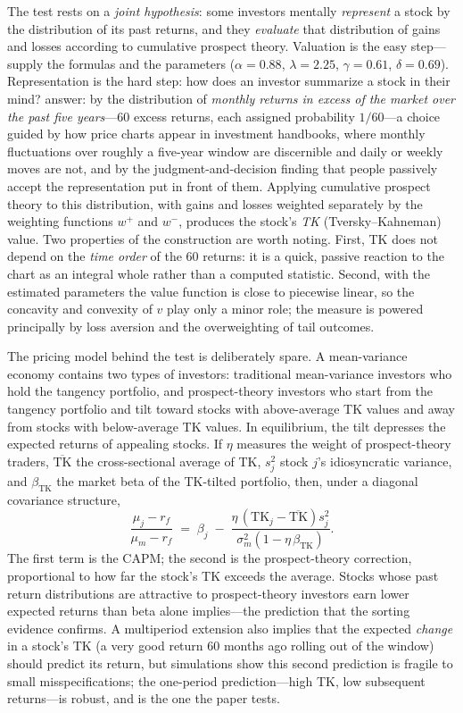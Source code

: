 The test rests on a \emph{joint hypothesis}: some investors mentally \emph{represent} a stock by the distribution of its past returns, and they \emph{evaluate} that distribution of gains and losses according to cumulative prospect theory. Valuation is the easy step---\citet{tversky1992} supply the formulas and the parameters ($\alpha = 0.88$, $\lambda = 2.25$, $\gamma = 0.61$, $\delta = 0.69$). Representation is the hard step: how does an investor summarize a stock in their mind? \citet{barberis2016} answer: by the distribution of \emph{monthly returns in excess of the market over the past five years}---60 excess returns, each assigned probability $1/60$---a choice guided by how price charts appear in investment handbooks, where monthly fluctuations over roughly a five-year window are discernible and daily or weekly moves are not, and by the judgment-and-decision finding that people passively accept the representation put in front of them. Applying cumulative prospect theory to this distribution, with gains and losses weighted separately by the weighting functions $w^{+}$ and $w^{-}$, produces the stock's \emph{TK} (Tversky--Kahneman) value. Two properties of the construction are worth noting. First, TK does not depend on the \emph{time order} of the 60 returns: it is a quick, passive reaction to the chart as an integral whole rather than a computed statistic. Second, with the estimated parameters the value function is close to piecewise linear, so the concavity and convexity of $v$ play only a minor role; the measure is powered principally by loss aversion and the overweighting of tail outcomes.

The pricing model behind the test is deliberately spare. A mean-variance economy contains two types of investors: traditional mean-variance investors who hold the tangency portfolio, and prospect-theory investors who start from the tangency portfolio and tilt toward stocks with above-average TK values and away from stocks with below-average TK values. In equilibrium, the tilt depresses the expected returns of appealing stocks. If $\eta$ measures the weight of prospect-theory traders, $\overline{\mathrm{TK}}$ the cross-sectional average of TK, $s_j^2$ stock $j$'s idiosyncratic variance, and $\beta_{\mathrm{TK}}$ the market beta of the TK-tilted portfolio, then, under a diagonal covariance structure,
\[
\frac{\mu_j - r_f}{\mu_m - r_f}
\;=\;
\beta_j \;-\; \frac{\eta\,\left(\mathrm{TK}_j - \overline{\mathrm{TK}}\right) s_j^2}{\sigma_m^2\left(1 - \eta\,\beta_{\mathrm{TK}}\right)}.
\]
The first term is the CAPM; the second is the prospect-theory correction, proportional to how far the stock's TK exceeds the average. Stocks whose past return distributions are attractive to prospect-theory investors earn lower expected returns than beta alone implies---the prediction that the sorting evidence confirms. A multiperiod extension also implies that the expected \emph{change} in a stock's TK (a very good return 60 months ago rolling out of the window) should predict its return, but simulations show this second prediction is fragile to small misspecifications; the one-period prediction---high TK, low subsequent returns---is robust, and is the one the paper tests.

